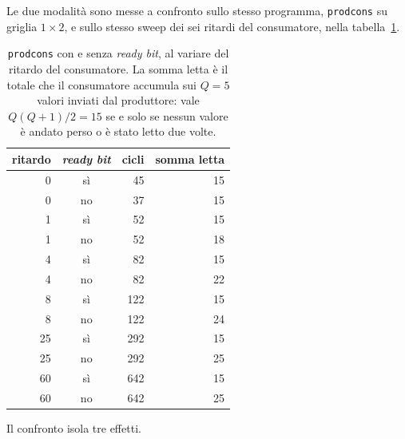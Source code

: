 Le due modalità sono messe a confronto sullo stesso programma, \texttt{prodcons}
su griglia $1\times2$, e sullo stesso sweep dei sei ritardi del consumatore,
nella tabella~\ref{tab:nobp}.

\begin{table}[htbp]
    \centering
    \begin{tabular}{rcrr}
        \toprule
        ritardo & \emph{ready bit} & cicli & somma letta \\
        \midrule
        0  & sì & 45  & 15 \\
        0  & no & 37  & 15 \\
        1  & sì & 52  & 15 \\
        1  & no & 52  & 18 \\
        4  & sì & 82  & 15 \\
        4  & no & 82  & 22 \\
        8  & sì & 122 & 15 \\
        8  & no & 122 & 24 \\
        25 & sì & 292 & 15 \\
        25 & no & 292 & 25 \\
        60 & sì & 642 & 15 \\
        60 & no & 642 & 25 \\
        \bottomrule
    \end{tabular}
    \caption{\texttt{prodcons} con e senza \emph{ready bit}, al variare del ritardo
         del consumatore. La somma letta è il totale che il consumatore
         accumula sui $Q = 5$ valori inviati dal produttore: vale
         $Q(Q+1)/2 = 15$ se e solo se nessun valore è andato perso o è stato
         letto due volte.}
    \label{tab:nobp}
\end{table}

Il confronto isola tre effetti.

